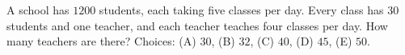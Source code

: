 A school has $1200$ students, each taking five classes per day. Every class has $30$ students and one teacher, and each teacher teaches four classes per day. How many teachers are there? Choices: (A) $30$, (B) $32$, (C) $40$, (D) $45$, (E) $50$.
